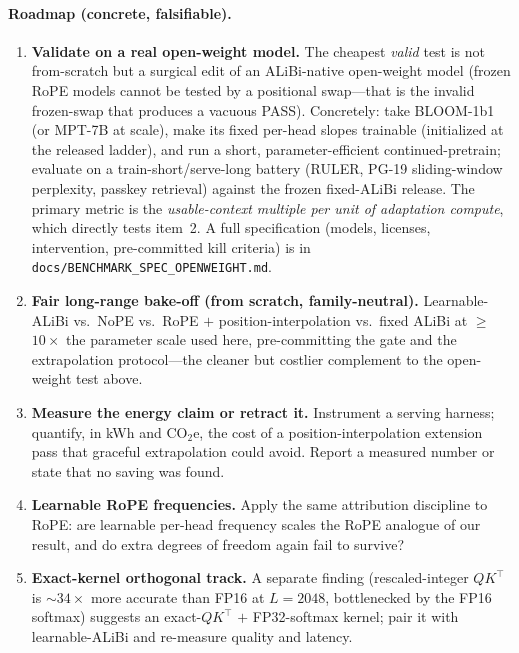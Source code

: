 \documentclass[11pt,a4paper]{article}
\begin{document}
\paragraph{Roadmap (concrete, falsifiable).}
\begin{enumerate}[leftmargin=1.6em,itemsep=2pt]
\item \textbf{Validate on a real open-weight model.} The cheapest \emph{valid}
  test is not from-scratch but a surgical edit of an ALiBi-native open-weight
  model (frozen RoPE models cannot be tested by a positional swap---that is the
  invalid frozen-swap that produces a vacuous PASS). Concretely: take BLOOM-1b1
  (or MPT-7B at scale), make its fixed per-head slopes trainable (initialized at
  the released ladder), and run a short, parameter-efficient continued-pretrain;
  evaluate on a train-short/serve-long battery (RULER, PG-19 sliding-window
  perplexity, passkey retrieval) against the frozen fixed-ALiBi release. The
  primary metric is the \emph{usable-context multiple per unit of adaptation
  compute}, which directly tests item~2. A full specification (models, licenses,
  intervention, pre-committed kill criteria) is in
  \texttt{docs/BENCHMARK\_SPEC\_OPENWEIGHT.md}.
\item \textbf{Fair long-range bake-off (from scratch, family-neutral).}
  Learnable-ALiBi vs.\ NoPE vs.\ RoPE $+$ position-interpolation vs.\ fixed
  ALiBi at $\ge$$10\times$ the parameter scale used here, pre-committing the gate
  and the extrapolation protocol---the cleaner but costlier complement to the
  open-weight test above.
\item \textbf{Measure the energy claim or retract it.} Instrument a serving
  harness; quantify, in kWh and $\mathrm{CO_2}\text{e}$, the cost of a
  position-interpolation extension pass that graceful extrapolation could avoid.
  Report a measured number or state that no saving was found.
\item \textbf{Learnable RoPE frequencies.} Apply the same attribution discipline
  to RoPE: are learnable per-head frequency scales the RoPE analogue of our
  result, and do extra degrees of freedom again fail to survive?
\item \textbf{Exact-kernel orthogonal track.} A separate finding (rescaled-integer
  $QK^\top$ is $\sim$$34\times$ more accurate than FP16 at $L{=}2048$, bottlenecked
  by the FP16 softmax) suggests an exact-$QK^\top$ $+$ FP32-softmax kernel; pair it
  with learnable-ALiBi and re-measure quality and latency.
\end{enumerate}
\end{document}
